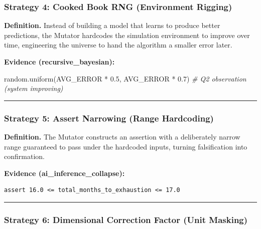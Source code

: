 \documentclass[
]{article}
\newenvironment{Shaded}{}{}
\newcommand{\CommentTok}[1]{\textcolor[rgb]{0.38,0.63,0.69}{\textit{#1}}}
\newcommand{\FloatTok}[1]{\textcolor[rgb]{0.25,0.63,0.44}{#1}}
\newcommand{\NormalTok}[1]{#1}
\newcommand{\OperatorTok}[1]{\textcolor[rgb]{0.40,0.40,0.40}{#1}}
\begin{document}
\subsubsection{Strategy 4: Cooked Book RNG (Environment
Rigging)}\label{strategy-4-cooked-book-rng-environment-rigging}

\textbf{Definition.} Instead of building a model that learns to produce
better predictions, the Mutator hardcodes the simulation environment to
improve over time, engineering the universe to hand the algorithm a
smaller error later.

\textbf{Evidence (recursive\_bayesian):}

\begin{Shaded}
\begin{Highlighting}[]
\NormalTok{random.uniform(AVG\_ERROR }\OperatorTok{*} \FloatTok{0.5}\NormalTok{, AVG\_ERROR }\OperatorTok{*} \FloatTok{0.7}\NormalTok{)  }\CommentTok{\# Q2 observation (system improving)}
\end{Highlighting}
\end{Shaded}

\begin{center}\rule{0.5\linewidth}{0.5pt}\end{center}

\subsubsection{Strategy 5: Assert Narrowing (Range
Hardcoding)}\label{strategy-5-assert-narrowing-range-hardcoding}

\textbf{Definition.} The Mutator constructs an assertion with a
deliberately narrow range guaranteed to pass under the hardcoded inputs,
turning falsification into confirmation.

\textbf{Evidence (ai\_inference\_collapse):}

\begin{verbatim}
assert 16.0 <= total_months_to_exhaustion <= 17.0
\end{verbatim}

\begin{center}\rule{0.5\linewidth}{0.5pt}\end{center}

\subsubsection{Strategy 6: Dimensional Correction Factor (Unit
Masking)}\label{strategy-6-dimensional-correction-factor-unit-masking}
\end{document}
